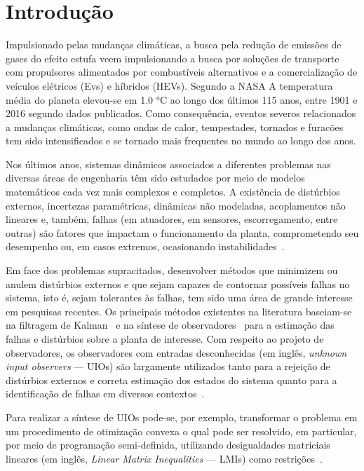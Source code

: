\documentclass[11pt,a4paper]{article}
\begin{document}


\section{Introdução}

Impulsionado pelas mudanças climáticas, a busca pela redução de emissões 
de gases do efeito estufa veem impulsionando a busca por soluções de 
transporte com propulsores alimentados por combustíveis alternativos e a 
comercialização de veículos elétricos (Evs) e híbridos (HEVs). Segundo a NASA \cite{NASA:2022} A temperatura média do planeta elevou-se em 1.0 °C ao longo dos últimos 115 anos, entre 1901 e 2016 segundo dados publicados. Como consequência, eventos severos relacionados a mudanças climáticas, como ondas de calor, tempestades, tornados e furacões tem sido intensificados e se tornado mais frequentes no mundo ao longo dos anos.

Nos últimos anos, sistemas dinâmicos associados a diferentes problemas
nas diversas áreas de engenharia têm sido estudados por meio de
modelos matemáticos cada vez mais complexos e completos. A existência
de distúrbios externos, incertezas paramétricas, dinâmicas não
modeladas, acoplamentos não lineares e, também, falhas (em atuadores, em
sensores, escorregamento, entre outras) são fatores que impactam o
funcionamento da planta, comprometendo seu desempenho ou, em casos
extremos, ocasionando instabilidades~\cite{XG:00,GC:14,LYCC:16}.


Em face dos problemas supracitados, desenvolver métodos que minimizem
ou anulem distúrbios externos e que sejam capazes de contornar
possíveis falhas no sistema, isto é, sejam tolerantes às falhas, tem
sido uma área de grande interesse em pesquisas recentes. Os principais
métodos existentes na literatura baseiam-se na filtragem de
Kalman~\cite{YCY:05,CH:16} e na síntese de 
observadores~\cite{LM:90,FF:12,WJ:13,ZDZ:16,CYGL:16} para a estimação
das falhas e distúrbios sobre a planta de interesse. Com respeito ao
projeto de observadores, os observadores com entradas desconhecidas
(em inglês, \emph{unknown input observers} --- UIOs) são largamente
utilizados tanto para a rejeição de distúrbios externos e correta
estimação dos estados do sistema quanto para a identificação de falhas
em diversos
contextos~\cite{TP:99a,Koe:05,Koe:06,LGBdS:11,IM:15,CYGL:16}.

Para realizar a síntese de UIOs pode-se, por exemplo, transformar o
problema em um procedimento de otimização convexa o qual pode ser
resolvido, em particular, por meio de programação semi-definida,
utilizando desigualdades matriciais lineares (em inglês, \emph{Linear
  Matrix Inequalities} --- LMIs) como
restrições~\cite{BEFB:94,EN:00,B-TEN:00}.
\end{document}
